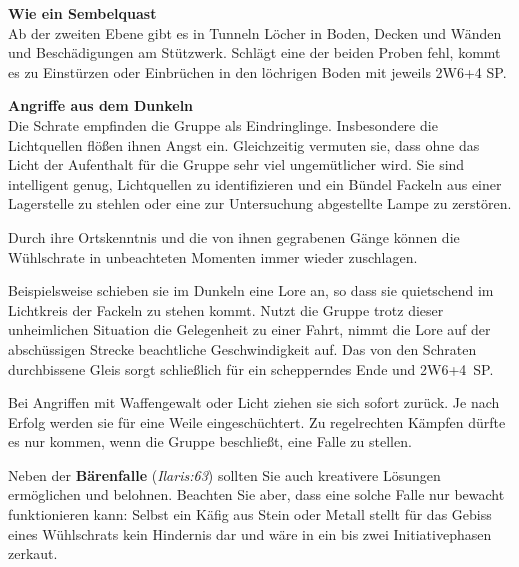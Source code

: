 \textbf{Wie ein Sembelquast}\\
Ab der zweiten Ebene gibt es in Tunneln Löcher in Boden, Decken und Wänden und Beschädigungen am Stützwerk.
Schlägt eine der beiden Proben fehl, kommt es zu Einstürzen oder Einbrüchen in den löchrigen Boden mit jeweils 2W6+4 SP.
\bigskip

\textbf{Angriffe aus dem Dunkeln}\\
Die Schrate empfinden die Gruppe als Eindringlinge.
Insbesondere die Lichtquellen flößen ihnen Angst ein.
Gleichzeitig vermuten sie, dass ohne das Licht der Aufenthalt für die Gruppe sehr viel ungemütlicher wird.
Sie sind intelligent genug, Lichtquellen zu identifizieren und ein Bündel Fackeln aus einer Lagerstelle zu stehlen oder eine zur Untersuchung abgestellte Lampe zu zerstören.

Durch ihre Ortskenntnis und die von ihnen gegrabenen Gänge können die Wühlschrate in unbeachteten Momenten immer wieder zuschlagen.


Beispielsweise schieben sie im Dunkeln eine Lore an, so dass sie quietschend im Lichtkreis der Fackeln zu stehen kommt.
Nutzt die Gruppe trotz dieser unheimlichen Situation die Gelegenheit zu einer Fahrt, nimmt die Lore auf der abschüssigen Strecke beachtliche Geschwindigkeit auf.
Das von den Schraten durchbissene Gleis sorgt schließlich für ein schepperndes Ende und 2W6+4~SP.

Bei Angriffen mit Waffengewalt oder Licht ziehen sie sich sofort zurück. Je nach Erfolg werden sie für eine Weile eingeschüchtert.
Zu regelrechten Kämpfen dürfte es nur kommen, wenn die Gruppe beschließt, eine Falle zu stellen.

Neben der \textbf{Bärenfalle} (\emph{Ilaris:63}) sollten Sie auch kreativere Lösungen ermöglichen und belohnen.
Beachten Sie aber, dass eine solche Falle nur bewacht funktionieren kann:
Selbst ein Käfig aus Stein oder Metall stellt für das Gebiss eines Wühlschrats kein Hindernis dar und wäre in ein bis zwei Initiativephasen zerkaut.


